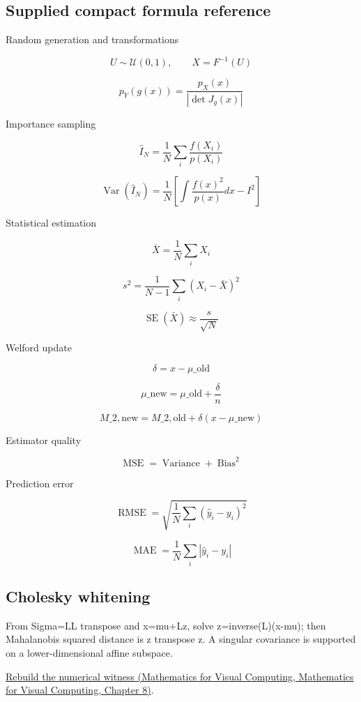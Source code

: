 \subsection{Supplied compact formula reference}\label{appendix-cb5af353ef77-supplied-compact-formula-reference}

Random generation and transformations

\[
 U\sim\mathcal U(0,1),\qquad X=F^{-1}(U) 
\]

\[
 p_Y(g(x)) = \frac{p_X(x)}{|\det J_g(x)|} 
\]

Importance sampling

\[
 \widehat I_N= \frac1N\sum_i\frac{f(X_i)}{p(X_i)} 
\]

\[
 \operatorname{Var}(\widehat I_N) = \frac1N \left[ \int\frac{f(x)^2}{p(x)}dx-I^2 \right] 
\]

Statistical estimation

\[
 \bar X=\frac1N\sum_iX_i 
\]

\[
 s^2=\frac1{N-1}\sum_i(X_i-\bar X)^2 
\]

\[
 \operatorname{SE}(\bar X)\approx\frac{s}{\sqrt N} 
\]

Welford update

\[
 \delta=x-\mu\_{\mathrm{old}} 
\]

\[
 \mu\_{\mathrm{new}}= \mu\_{\mathrm{old}}+\frac{\delta}{n} 
\]

\[
 M\_{2,\mathrm{new}}= M\_{2,\mathrm{old}}+ \delta(x-\mu\_{\mathrm{new}}) 
\]

Estimator quality

\[
 \operatorname{MSE}= \operatorname{Variance}+ \operatorname{Bias}^2 
\]

Prediction error

\[
 \operatorname{RMSE}= \sqrt{\frac1N\sum_i(\hat y_i-y_i)^2} 
\]

\[
 \operatorname{MAE}= \frac1N\sum_i|\hat y_i-y_i| 
\]

\subsection{Cholesky whitening}\label{appendix-cb5af353ef77-cholesky-whitening}

From Sigma=LL transpose and x=mu+Lz, solve z=inverse(L)(x-mu); then Mahalanobis squared distance is z transpose z. A singular covariance is supported on a lower-dimensional affine subspace.

\href{../02-Mathematics-for-Visual-Computing/main.pdf\#nameddest=02-foundations-ii-ch024-original-bridge-whiten-a-covariance-ellipse}{Rebuild the numerical witness (Mathematics for Visual Computing, Mathematics for Visual Computing, Chapter 8)}.

